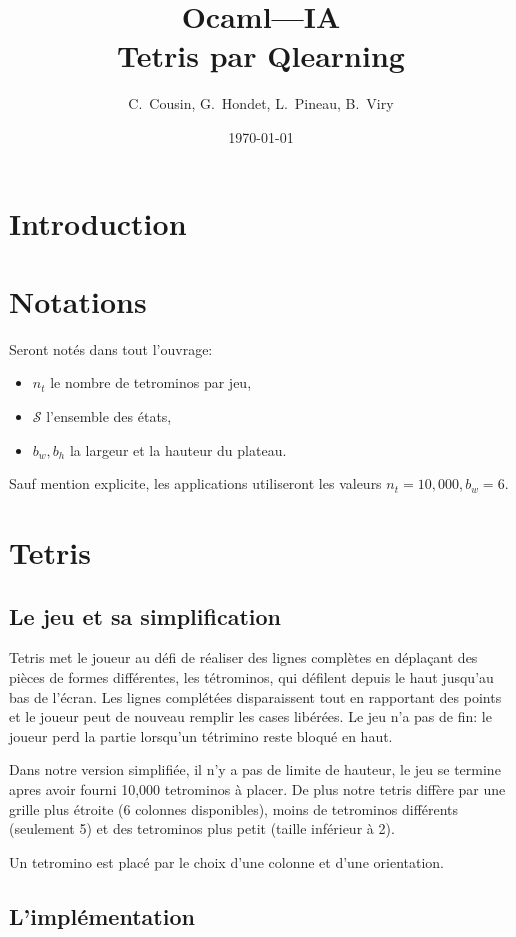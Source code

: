 \documentclass{article}
\title{Ocaml---IA\\Tetris par Qlearning}
\author{C.~Cousin, G.~Hondet, L.~Pineau, B.~Viry}
\date{\today}
\begin{document}
\maketitle
\tableofcontents

\section*{Introduction}

\section*{Notations}
Seront not\'es dans tout l'ouvrage:
\begin{itemize}
  \item \(n_t\) le nombre de tetrominos par jeu,
  \item \(\mathcal{S}\) l'ensemble des \'etats,
  \item \(b_w, b_h\) la largeur et la hauteur du plateau.
\end{itemize}
Sauf mention explicite, les applications utiliseront les valeurs \(n_t=10,000,
b_w = 6\).

\section{Tetris}

\subsection{Le jeu et sa simplification}
Tetris met le joueur au défi de réaliser des lignes complètes en déplaçant des
pièces de formes différentes, les tétrominos, qui défilent depuis le haut
jusqu'au bas de l'écran. Les lignes complétées disparaissent tout en rapportant
des points et le joueur peut de nouveau remplir les cases libérées. Le jeu
n'a pas de fin: le joueur perd la partie lorsqu'un tétrimino reste bloqué en
haut.

Dans notre version simplifiée, il n'y a pas de limite de hauteur, le jeu se
termine apres avoir fourni 10,000 tetrominos à placer. De plus notre
tetris diffère par une grille plus étroite (6 colonnes disponibles), moins de
tetrominos différents (seulement 5) et des tetrominos plus petit (taille
inférieur à 2).

Un tetromino est plac\'e par le choix d'une colonne et d'une orientation.

\subsection{L'impl\'ementation}
\end{document}
